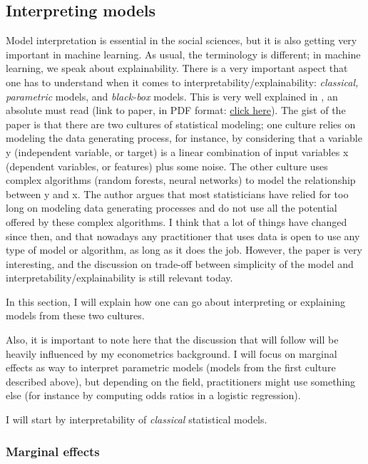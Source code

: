 \documentclass[
]{article}
\begin{document}
\hypertarget{interpreting-models}{%
\subsection{Interpreting models}\label{interpreting-models}}

Model interpretation is essential in the social sciences, but it is also getting very important
in machine learning. As usual, the terminology is different; in machine learning, we speak about
explainability. There is a very important aspect that one has to understand when it comes to
interpretability/explainability: \emph{classical, parametric} models, and \emph{black-box} models. This
is very well explained in \citet{breiman2001}, an absolute must read (link to paper, in PDF format:
\href{https://projecteuclid.org/download/pdf_1/euclid.ss/1009213726}{click here}). The gist of the paper
is that there are two cultures of statistical modeling; one culture relies on modeling the data
generating process, for instance, by considering that a variable y (independent variable, or target)
is a linear combination of input variables x (dependent variables, or features) plus some noise. The
other culture uses complex algorithms (random forests, neural networks)
to model the relationship between y and x. The author argues that most statisticians have relied
for too long on modeling data generating processes and do not use all the potential offered by
these complex algorithms. I think that a lot of things have changed since then, and that nowadays
any practitioner that uses data is open to use any type of model or algorithm, as long as it does
the job. However, the paper is very interesting, and the discussion on trade-off between
simplicity of the model and interpretability/explainability is still relevant today.

In this section, I will explain how one can go about interpreting or explaining models from these
two cultures.

Also, it is important to note here that the discussion that will follow will be heavily influenced
by my econometrics background. I will focus on marginal effects as way to interpret parametric
models (models from the first culture described above), but depending on the field, practitioners
might use something else (for instance by computing odds ratios in a logistic regression).

I will start by interpretability of \emph{classical} statistical models.

\hypertarget{marginal-effects}{%
\subsubsection{Marginal effects}\label{marginal-effects}}
\end{document}
